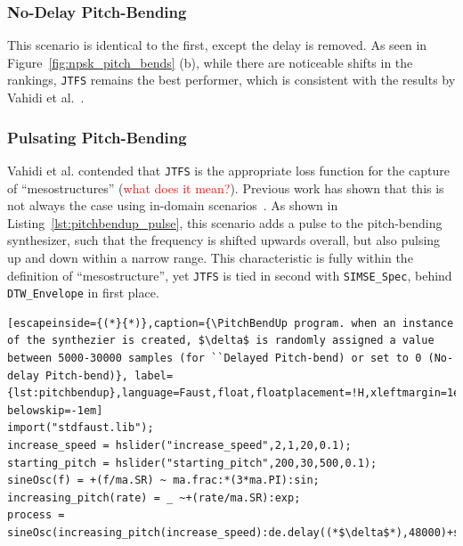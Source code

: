 \documentclass{article} %
\newcommand{\todo}[1]{\textcolor{red}{#1}}
\newcommand{\SIMSESpec}{\texttt{SIMSE\_Spec}\xspace}
\newcommand{\JTFS}{\texttt{JTFS}\xspace}
\newcommand{\DTWEnv}{\texttt{DTW\_Envelope}\xspace}
\newcommand{\PitchBendUp}{\textbf{PitchBend-Up}\xspace}
\begin{document}
\subsubsection{No-Delay Pitch-Bending}
This scenario is identical to the first, except the delay is removed. As seen in Figure~\ref{fig:npsk_pitch_bends} (b), while there are noticeable shifts in the rankings, \JTFS remains the best performer, which is consistent with the results by Vahidi et al.~\cite{vahidi2023mesostructures}.

\subsubsection{Pulsating Pitch-Bending}
Vahidi et al. contended that \JTFS is the appropriate loss function for the capture of ``mesostructures'' (\todo{what does it mean?}). Previous work has shown that this is not always the case using in-domain scenarios~\cite{salimi2025soundmatching}. As shown in Listing~\ref{lst:pitchbendup_pulse}, this scenario adds a pulse to the pitch-bending synthesizer, such that the frequency is shifted upwards overall, but also pulsing up and down within a narrow range. This characteristic is fully within the definition of ``mesostructure'', yet \JTFS is tied in second with \SIMSESpec, behind \DTWEnv in first place. 





\begin{lstlisting}[escapeinside={(*}{*)},caption={\PitchBendUp program. when an instance of the synthezier is created, $\delta$ is randomly assigned a value between 5000-30000 samples (for ``Delayed Pitch-bend) or set to 0 (No-delay Pitch-bend)}, label={lst:pitchbendup},language=Faust,float,floatplacement=!H,xleftmargin=1em,xrightmargin=0.5em,firstnumber=0,aboveskip=0em, belowskip=-1em]
import("stdfaust.lib");
increase_speed = hslider("increase_speed",2,1,20,0.1);
starting_pitch = hslider("starting_pitch",200,30,500,0.1);
sineOsc(f) = +(f/ma.SR) ~ ma.frac:*(3*ma.PI):sin;
increasing_pitch(rate) = _ ~+(rate/ma.SR):exp;
process = sineOsc(increasing_pitch(increase_speed):de.delay((*$\delta$*),48000)+starting_pitch);

\end{lstlisting}
\end{document}
